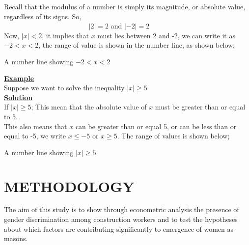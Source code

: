 \documentclass[12pt]{report}
\newcommand{\ubt}[1]{\textbf{\underline{#1}}}
\newcommand{\NI}{\noindent}
\begin{document}
	\NI Recall that the modulus of a number is simply its magnitude, or absolute value, regardless of its signs. So,\\
		$\left.\right.\qquad\qquad\qquad\qquad\qquad\qquad$ $|2|=2$ and $|-2|=2$\\
		
	\NI Now, $|x|<2$, it implies that $x$ must lies between 2 and -2, we can write it as $-2<x<2$, the range of value is shown in the number line, as shown below;
	\begin{center}
		A number line showing $-2 < x < 2$\\
	\end{center}
	\ubt{Example}\\
	Suppose we want to solve the inequality $|x|\geq 5$\\
	
	\NI\ubt{Solution}\\
	If $|x| \geq 5$; This mean that the absolute value of $x$ must be greater than or equal to 5.\\
	
	\NI This also means that $x$ can be greater than or equal 5, or can be less than or equal to -5, we write $x\leq -5$ or $x\geq 5$. The range of values is shown below;
	\begin{center}
		A number line showing $|x| \geq 5$\\
	\end{center}
	
	
	\chapter{METHODOLOGY}
	The aim of this study is to show through econometric analysis the presence of gender discrimination among construction workers and to test the hypotheses about which factors are contributing significantly to emergence of women as masons.\\
	
\end{document}
